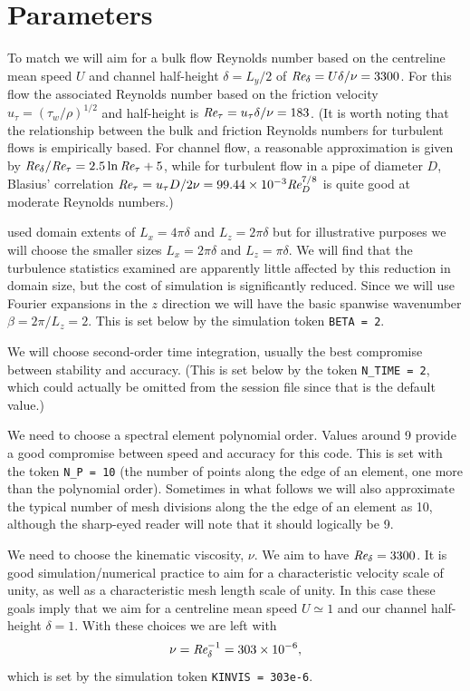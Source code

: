 \documentclass[11pt,a4paper]{report}
\def\Rey{\mbox{\it Re}}                             %
\begin{document}
\section{Parameters}

To match \citet{kmm87} we will aim for a bulk flow Reynolds number
based on the centreline mean speed $U$ and channel half-height
$\delta=L_y/2$ of $\Rey_\delta=U\delta/\nu=3300$.  For this flow the
associated Reynolds number based on the friction velocity
$u_\tau=(\tau_w/\rho)^{1/2}$ and half-height is
$\Rey_\tau=u_\tau\delta/\nu=183$. (It is worth noting that the
relationship between the bulk and friction Reynolds numbers for
turbulent flows is empirically based. For channel flow, a reasonable
approximation is given by $\Rey_\delta/\Rey_\tau=2.5\ln\Rey_\tau+5$,
while for turbulent flow in a pipe of diameter $D$, Blasius'
correlation $\Rey_\tau=u_\tau D/2\nu=99.44\times10^{-3}\Rey_D^{7/8}$
is quite good at moderate Reynolds numbers.)

\citet{kmm87} used domain extents of $L_x=4\pi\delta$ and
$L_z=2\pi\delta$ but for illustrative purposes we will choose the
smaller sizes $L_x=2\pi\delta$ and $L_z=\pi\delta$. We will find that
the turbulence statistics examined are apparently little affected by
this reduction in domain size, but the cost of simulation is
significantly reduced.  Since we will use Fourier expansions in the
$z$ direction we will have the basic spanwise wavenumber
$\beta=2\pi/L_z=2$.  This is set below by the simulation token
\texttt{BETA = 2}.

We will choose second-order time integration, usually the best
compromise between stability and accuracy.  (This is set below by the
token \texttt{N\_TIME = 2}, which could actually be omitted from the
session file since that is the default value.)

We need to choose a spectral element polynomial order. Values around 9
provide a good compromise between speed and accuracy for this
code. This is set with the token \texttt{N\_P = 10} (the number of
points along the edge of an element, one more than the polynomial
order).  Sometimes in what follows we will also approximate the
typical number of mesh divisions along the the edge of an element as
10, although the sharp-eyed reader will note that it should logically
be 9.

We need to choose the kinematic viscosity, $\nu$. We aim to have
$\Rey_\delta=3300$. It is good simulation/numerical practice to aim
for a characteristic velocity scale of unity, as well as a
characteristic mesh length scale of unity. In this case these goals
imply that we aim for a centreline mean speed $U\simeq1$ and our
channel half-height $\delta=1$.  With these choices we are left with
\[
  \nu = \Rey_\delta^{-1} = 303 \times 10^{-6},
\]
which is set by the simulation token \texttt{KINVIS = 303e-6}.
\end{document}
